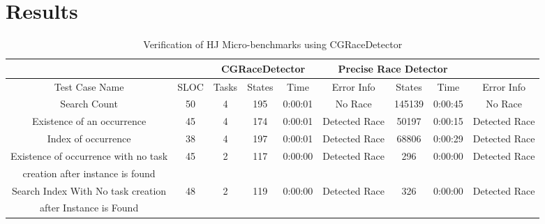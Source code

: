 \section{Results}

\begin{table*}[t]
\centering
\caption{Verification of HJ Micro-benchmarks using CGRaceDetector}
\label{tab:perf}
\begin{tabular}{|c|c|c|c|c|c|c|c|c|}
\hline
        &        & \multicolumn{3}{c|}{CGRaceDetector} & \multicolumn{3}{c|}{Precise Race Detector}
 \\ \hline
Test Case Name & SLOC & Tasks & States  & Time   & Error Info & States  & Time   & Error Info 
\\ \hline
Search Count & 50 & 4 & 195 & 0:00:01 & No Race & 145139 & 0:00:45 & No Race 
 \\ \hline
Existence of an occurrence & 45 & 4 & 174 & 0:00:01 & Detected Race & 50197 & 0:00:15 & Detected Race 
\\ \hline
Index of occurrence & 38 & 4 & 197 & 0:00:01 & Detected Race & 68806 & 0:00:29 & Detected Race 
\\ \hline
Existence of occurrence with no task & 45 & 2 & 117 & 0:00:00 & Detected Race & 296 & 0:00:00 & Detected Race
\\ 
creation after instance is found & &  &  &  & & & &
\\ \hline
Search Index With No task creation & 48  & 2 & 119 & 0:00:00 & Detected Race & 326 & 0:00:00 & Detected Race
\\
after Instance is Found &  &  &  & & & & &
\\ \hline
\end{tabular}
\end{table*}


